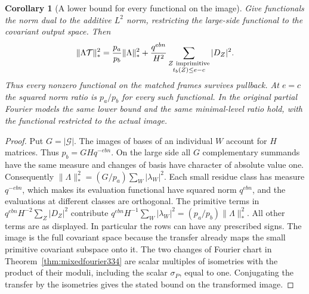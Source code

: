 \documentclass[a4paper,11pt]{article}
\newtheorem{corollary}[proposition]{Corollary}
\theoremstyle{definition}
\theoremstyle{remark}
\numberwithin{equation}{section}
\begin{document}
\begin{corollary}[A lower bound for every functional on the image]\label{cor:dualnorm335}
Give functionals the norm dual to the additive \(L^2\) norm, restricting
the large-side functional to the covariant output space. Then
\[
 \begin{split}
   \|\Lambda\mathcal T\|_*^2
    =\frac{p_a}{p_b}\|\Lambda\|_*^2+
       \frac{q^{ebn}}{H^2}
       \sum_{\substack{Z\ {\rm imprimitive}\\t_b(Z)\le e-c}} |D_Z|^2 .
 \end{split}
\]
Thus every nonzero functional on the matched frames survives pullback.
At \(e=c\) the squared norm ratio is \(p_a/p_b\) for every such
functional. In the original partial Fourier models the same lower
bound and the same minimal-level ratio hold, with the functional
restricted to the actual image.
\end{corollary}
\begin{proof}
Put \(G=|\mathcal G|\). The images of bases of an individual
\(W\) account for \(H\) matrices. Thus \(p_b=GHq^{-ebn}\).
On the large side all \(G\) complementary summands have the same
measure and changes of basis have character of absolute value one.
Consequently \(\|\Lambda\|_*^2=(G/p_a)\sum_W|\lambda_W|^2\).
Each small residue class has measure \(q^{-ebn}\), which makes its
evaluation functional have squared norm \(q^{ebn}\), and the evaluations
at different classes are orthogonal. The primitive terms in
\(q^{ebn}H^{-2}\sum_Z|D_Z|^2\) contribute
\(q^{ebn}H^{-1}\sum_W|\lambda_W|^2=(p_a/p_b)\|\Lambda\|_*^2\).
All other terms are as displayed. In particular the rows can have any
prescribed signs. The image is the full covariant space because the
transfer already maps the small primitive covariant subspace onto it.
The two changes of Fourier chart in Theorem~\ref{thm:mixedfourier334}
are scalar multiples of isometries with the product of their moduli,
including the scalar \(\sigma_P\), equal to one. Conjugating the
transfer by the isometries gives the stated bound on the transformed
image.
\end{proof}
\end{document}
